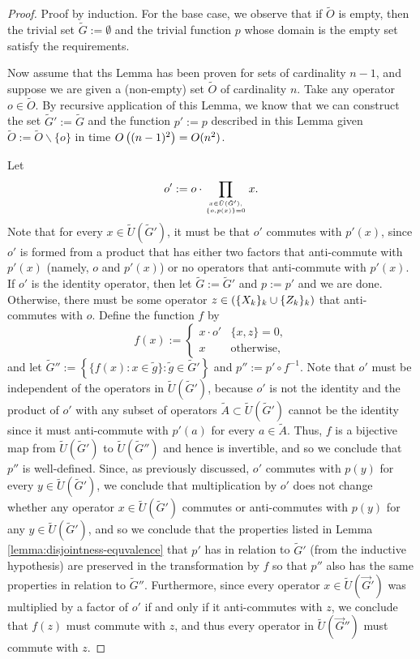 \documentclass[twocolumn,showpacs,preprintnumbers,amsmath,amssymb,nofootinbib,pra,floatfix]{revtex4-1}
\newcommand{\lst}{\vec}
\newcommand{\set}{\tilde}
\begin{document}
\begin{proof}
Proof by induction.  For the base case, we observe that if $\set O$ is empty, then the trivial set $\set G:=\emptyset$ and the trivial function $p$ whose domain is the empty set satisfy the requirements.

Now assume that ths Lemma has been proven for sets of cardinality $n-1$, and suppose we are given a (non-empty) set $\set O$ of cardinality $n$.  Take any operator $o\in\set O$.  By recursive application of this Lemma, we know that we can construct the set $\set G':=\set G$ and the function $p':=p$ described in this Lemma given $\set O:=\set O\backslash\{o\}$ in time $O\left((n-1)^2\right)=O(n^2)$.

Let $$o':=o\cdot \prod_{x\in\set U(\set G'),\atop\{o,p(x)\}=0} x.$$  Note that for every $x\in\set U(\set G')$, it must be that $o'$ commutes with $p'(x)$, since $o'$ is formed from a product that has either two factors that anti-commute with $p'(x)$ (namely, $o$ and $p'(x)$) or no operators that anti-commute with $p'(x)$.  If $o'$ is the identity operator, then let $\set G:=\set G'$ and $p:=p'$ and we are done.  Otherwise, there must be some operator $z\in\left(\{X_k\}_k \cup \{Z_k\}_k\right)$ that anti-commutes with $o$.  Define the function $f$ by
$$f(x) :=
\begin{cases}
x \cdot o' & \{x,z\}=0, \\
x          & \text{otherwise},
\end{cases}
$$
and let $\set G'':=\left\{\{f(x):x\in\set g\}:\set g\in\set G'\right\}$ and $p'':=p'\circ f^{-1}$.  Note that $o'$ must be independent of the operators in $\set U(\set G')$, because $o'$ is not the identity and the product of $o'$ with any subset of operators $\set A\subset\set U(\set G')$ cannot be the identity since it must anti-commute with $p'(a)$ for every $a\in\set A$.  Thus, $f$ is a bijective map from $\set U(\set G')$ to $\set U(\set G'')$ and hence is invertible, and so we conclude that $p''$ is well-defined.  Since, as previously discussed, $o'$ commutes with $p(y)$ for every $y\in\set U(\set G')$, we conclude that multiplication by $o'$ does not change whether any operator $x\in\set U(\set G')$ commutes or anti-commutes with $p(y)$ for any $y\in\set U(\set G')$, and so we conclude that the properties listed in Lemma \ref{lemma:disjointness-equvalence} that $p'$ has in relation to $\set G'$ (from the inductive hypothesis) are preserved in the transformation by $f$ so that $p''$ also has the same properties in relation to $\set G''$.  Furthermore, since every operator $x\in\set U(\lst G')$ was multiplied by a factor of $o'$ if and only if it anti-commutes with $z$, we conclude that $f(z)$ must commute with $z$, and thus every operator in $\set U(\lst G'')$ must commute with $z$.


\end{proof}
\end{document}
